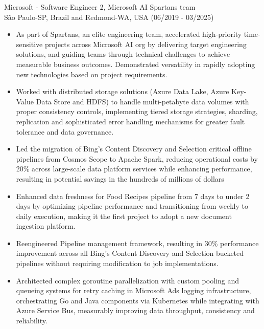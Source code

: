 
\normalsize{Microsoft - Software Engineer 2, Microsoft AI Spartans team}\\
    \scriptsize{São Paulo-SP, Brazil and Redmond-WA, USA (06/2019 - 03/2025)}
\begin{itemize}
    \item \scriptsize{As part of Spartans, an elite engineering team, accelerated high-priority
        time-sensitive projects across Microsoft AI org by delivering target engineering solutions, and
        guiding teams through technical challenges to achieve measurable business outcomes. Demonstrated
        versatility in rapidly adopting new technologies based on project requirements.}

    \item \scriptsize{Worked with distributed storage solutions (Azure Data Lake, Azure Key-Value Data
        Store and HDFS) to handle multi-petabyte data volumes with proper consistency controls,
        implementing tiered storage strategies, sharding, replication and sophisticated error handling
        mechanisms for greater fault tolerance and data governance.}

    \item \scriptsize{Led the migration of Bing's Content Discovery and Selection critical offline
        pipelines from Cosmos Scope to Apache Spark, reducing operational costs by 20\% across
        large-scale data platform services while enhancing performance, resulting in potential savings
        in the hundreds of millions of dollars}

    \item \scriptsize{Enhanced data freshness for Food Recipes pipeline from 7 days to under 2 days by
        optimizing pipeline performance and transitioning from weekly to daily execution, making it the
        first project to adopt a new document ingestion platform.}

    \item \scriptsize{Reengineered Pipeline management framework, resulting in 30\% performance
        improvement across all Bing's Content Discovery and Selection bucketed pipelines without
        requiring modification to job implementations.}

    \item \scriptsize{Architected complex goroutine parallelization with custom pooling and queueing
        systems for retry caching in Microsoft Ads logging infrastructure, orchestrating Go and Java
        components via Kubernetes while integrating with Azure Service Bus, measurably improving data
        throughput, consistency and reliability.}
    

\end{itemize}
